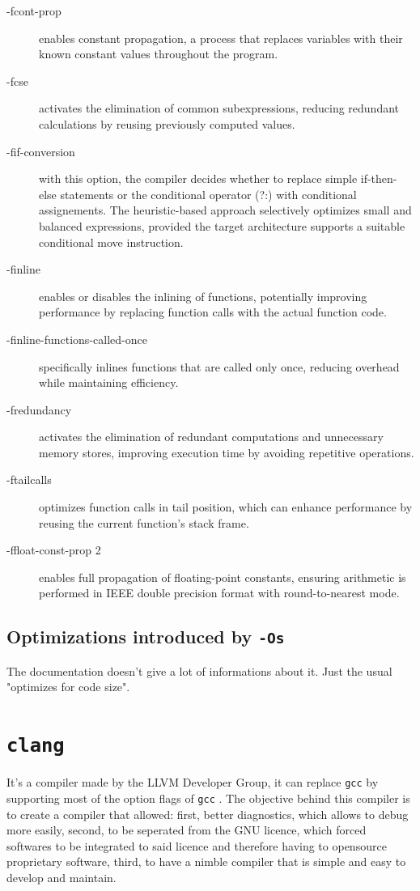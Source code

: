 \documentclass{rapport}
\newcommand{\gcc}{\texttt{gcc} }
\newcommand{\clang}{\texttt{clang} }
\newcommand{\optisize}{\texttt{-Os} }
\begin{document}
\begin{description}
    \item[-fcont-prop] enables constant propagation, a process that replaces variables with their known constant values throughout the program.
    \item[-fcse] activates the elimination of common subexpressions, reducing redundant calculations by reusing previously computed values.
    \item[-fif-conversion] with this option, the compiler decides whether to replace simple if-then-else statements or the conditional operator (?:) with conditional assignements.\newline
    The heuristic-based approach selectively optimizes small and balanced expressions, provided the target architecture supports a suitable conditional move instruction.
    \item[-finline]  enables or disables the inlining of functions, potentially improving performance by replacing function calls with the actual function code.
    \item[-finline-functions-called-once] specifically inlines functions that are called only once, reducing overhead while maintaining efficiency.
    \item[-fredundancy] activates the elimination of redundant computations and unnecessary memory stores, improving execution time by avoiding repetitive operations.
    \item[-ftailcalls] optimizes function calls in tail position, which can enhance performance by reusing the current function’s stack frame. 
    \item[-ffloat-const-prop 2] enables full propagation of floating-point constants, ensuring arithmetic is performed in IEEE double precision format with round-to-nearest mode.
\end{description}

\subsection*{Optimizations introduced by \optisize}
The documentation doesn't give a lot of informations about it. Just the usual "optimizes for code size".

\section{\clang}
It's a compiler made by the LLVM Developer Group, it can replace \gcc by supporting most of the option flags of \gcc. \newline
The objective behind this compiler is to create a compiler that allowed: first, better diagnostics, which allows to debug more easily, second, to be seperated from the GNU licence, which forced
softwares to be integrated to said licence and therefore having to open\-source proprietary software, third, to have a nimble compiler that is simple and easy to develop and maintain.
\end{document}
